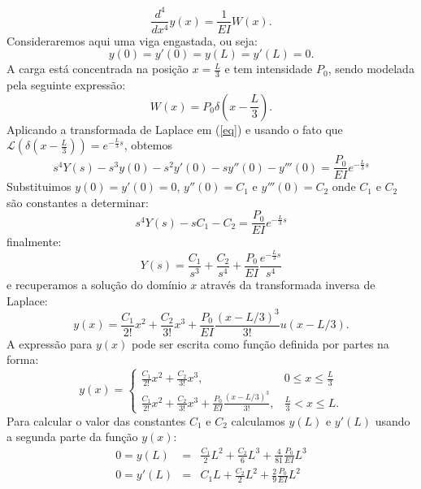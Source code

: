 \begin{equation}
\label{eq}\frac{d^4}{dx^4}y(x)=\frac{1}{EI}W(x).
\end{equation}
Consideraremos aqui uma viga engastada, ou seja: \begin{equation}y(0)=y'(0)=y(L)=y'(L)=0.\end{equation}
A carga está concentrada na posição $x=\frac{L}{3}$ e tem intensidade $P_0$, sendo modelada pela seguinte expressão:
\begin{equation}W(x)=P_0\delta\left(x-\frac{L}{3}\right).\end{equation}
Aplicando a transformada de Laplace em (\ref{eq}) e usando o fato que $\mathcal{L}\left(\delta\left(x-\frac{L}{3}\right)\right)=e^{-\frac{L}{3}s}$, obtemos
\begin{equation}s^4Y(s)-s^3y(0)-s^2y'(0)-sy''(0)-y'''(0)=\frac{P_0}{EI}e^{-\frac{L}{3}s}\end{equation}
Substituimos $y(0)=y'(0)=0$, $y''(0)=C_1$ e $y'''(0)=C_2$ onde $C_1$ e $C_2$ são constantes a determinar:
\begin{equation}s^4Y(s)-sC_1-C_2=\frac{P_0}{EI}e^{-\frac{L}{3}s}\end{equation}
finalmente:
\begin{equation}Y(s)=\frac{C_1}{s^3}+\frac{C_2}{s^4}+\frac{P_0}{EI}\frac{e^{-\frac{L}{3}s}}{s^4}\end{equation}
e recuperamos a solução do domínio $x$ através da transformada inversa de Laplace:
\begin{equation}y(x)=\frac{C_1}{2!}x^2+\frac{C_2}{3!}x^3+\frac{P_0}{EI}\frac{(x-L/3)^3}{3!}u(x-L/3).\end{equation}
A expressão para $y(x)$ pode ser escrita como função definida por partes na forma:
\begin{equation}y(x)=\left\{\begin{array}{ll}\frac{C_1}{2!}x^2+\frac{C_2}{3!}x^3,&0\leq x\leq\frac{L}{3} \\ \frac{C_1}{2!}x^2+\frac{C_2}{3!}x^3+\frac{P_0}{EI}\frac{(x-L/3)^3}{3!},&\frac{L}{3}<x\leq L .\end{array}\right.\end{equation}
Para calcular o valor das constantes $C_1$ e $C_2$ calculamos  $y(L)$ e $y'(L)$ usando a segunda parte da função $y(x)$:
\begin{eqnarray*}
0=y(L)&=&\frac{C_1}{2}L^2+\frac{C_2}{6}L^3+\frac{4}{81}\frac{P_0}{EI}L^3\\
0=y'(L)&=&C_1 L+\frac{C_2}{2}L^2+\frac{2}{9}\frac{P_0}{EI}L^2
\end{eqnarray*}
